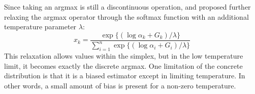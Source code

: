 \documentclass{article}
\begin{document}
Since taking an argmax is still a discontinuous operation, \cite{maddison2016concrete} and \cite{jang2016categorical} proposed further relaxing the argmax operator through the softmax function with an additional temperature parameter $\lambda$:
\begin{equation}
x_k = \frac{\exp\{( \log \alpha_k+ G_k) / \lambda\}}{\sum_{i=1}^n\exp\{( \log \alpha_i+ G_i) / \lambda\}}
\end{equation}
This relaxation allows values within the simplex, but in the low temperature limit, it becomes exactly the discrete argmax.
One limitation of the concrete distribution is that it is a biased estimator except in limiting temperature.
In other words, a small amount of bias is present for a non-zero temperature.
\end{document}
